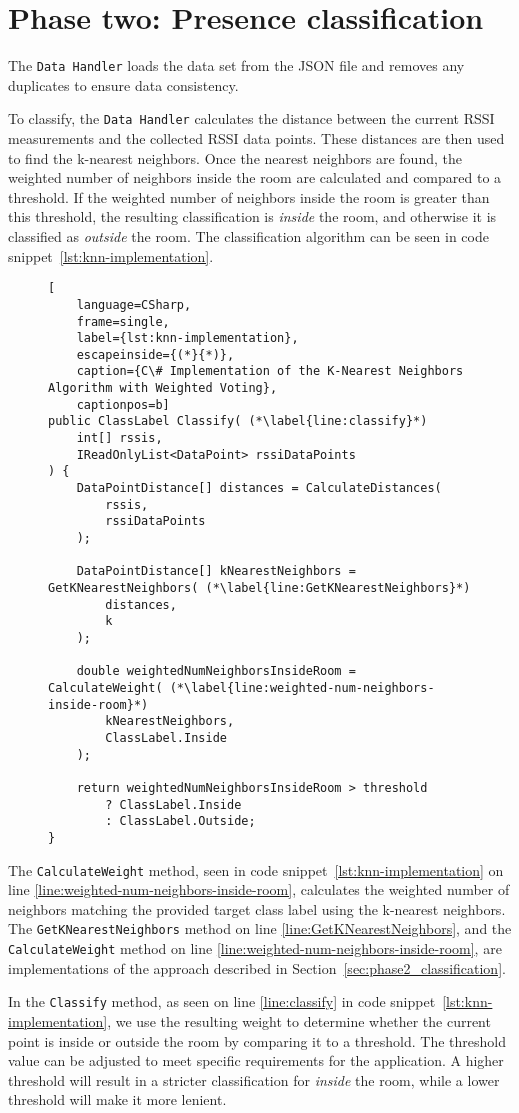 \section{Phase two: Presence classification}\label{sec:knn_implementation}
The \texttt{Data Handler} loads the data set from the JSON file and removes any duplicates to ensure data consistency.

To classify, the \texttt{Data Handler} calculates the distance between the current RSSI measurements and the collected RSSI data points.
These distances are then used to find the k-nearest neighbors.
Once the nearest neighbors are found, the weighted number of neighbors inside the room are calculated and compared to a threshold.
If the weighted number of neighbors inside the room is greater than this threshold, the resulting classification is \textit{inside} the room, and otherwise it is classified as \textit{outside} the room.
The classification algorithm can be seen in code snippet~\ref{lst:knn-implementation}.

\begin{figure}[H]
\begin{lstlisting}[
	language=CSharp, 
	frame=single, 
	label={lst:knn-implementation},
	escapeinside={(*}{*)},
	caption={C\# Implementation of the K-Nearest Neighbors Algorithm with Weighted Voting}, 
	captionpos=b] 
public ClassLabel Classify( (*\label{line:classify}*)
	int[] rssis, 
	IReadOnlyList<DataPoint> rssiDataPoints
) {
	DataPointDistance[] distances = CalculateDistances(
		rssis, 
		rssiDataPoints
	);

	DataPointDistance[] kNearestNeighbors = GetKNearestNeighbors( (*\label{line:GetKNearestNeighbors}*)
		distances,
		k
	);

	double weightedNumNeighborsInsideRoom = CalculateWeight( (*\label{line:weighted-num-neighbors-inside-room}*)
		kNearestNeighbors,
		ClassLabel.Inside
	);

	return weightedNumNeighborsInsideRoom > threshold 
		? ClassLabel.Inside 
		: ClassLabel.Outside;
}
\end{lstlisting}
\end{figure}

The \texttt{CalculateWeight} method, seen in code snippet~\ref{lst:knn-implementation} on line \ref{line:weighted-num-neighbors-inside-room}, calculates the weighted number of neighbors matching the provided target class label using the k-nearest neighbors. 
The \texttt{GetKNearestNeighbors} method on line \ref{line:GetKNearestNeighbors}, and the \texttt{CalculateWeight} method on line \ref{line:weighted-num-neighbors-inside-room}, are implementations of the approach described in Section~\ref{sec:phase2_classification}.

In the \texttt{Classify} method, as seen on line \ref{line:classify} in code snippet~\ref{lst:knn-implementation}, we use the resulting weight to determine whether the current point is inside or outside the room by comparing it to a threshold.
The threshold value can be adjusted to meet specific requirements for the application. A higher threshold will result in a stricter classification for \textit{inside} the room, while a lower threshold will make it more lenient.